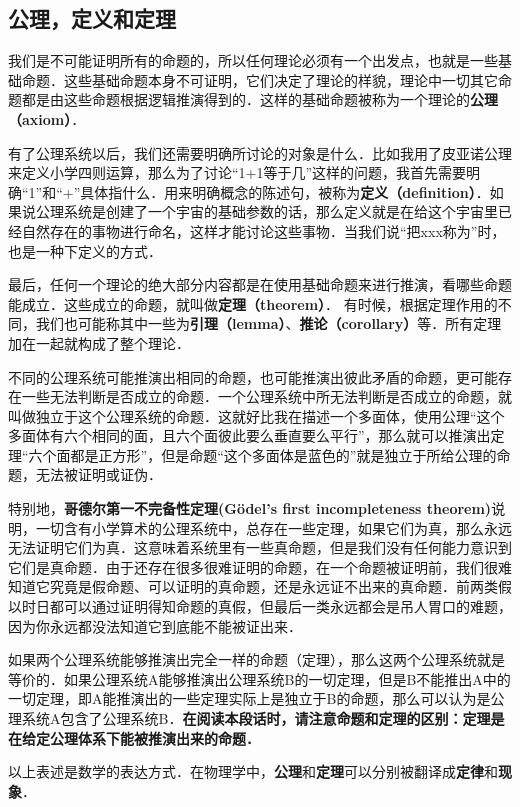 \subsection{公理，定义和定理}
我们是不可能证明所有的命题的，所以任何理论必须有一个出发点，也就是一些基础命题．这些基础命题本身不可证明，它们决定了理论的样貌，理论中一切其它命题都是由这些命题根据逻辑推演得到的．这样的基础命题被称为一个理论的\textbf{公理（axiom）}．

有了公理系统以后，我们还需要明确所讨论的对象是什么．比如我用了皮亚诺公理来定义小学四则运算，那么为了讨论“1+1等于几”这样的问题，我首先需要明确“1”和“+”具体指什么．用来明确概念的陈述句，被称为\textbf{定义（definition）}．如果说公理系统是创建了一个宇宙的基础参数的话，那么定义就是在给这个宇宙里已经自然存在的事物进行命名，这样才能讨论这些事物．当我们说“把xxx称为”时，也是一种下定义的方式．

最后，任何一个理论的绝大部分内容都是在使用基础命题来进行推演，看哪些命题能成立．这些成立的命题，就叫做\textbf{定理（theorem）}． 有时候，根据定理作用的不同，我们也可能称其中一些为\textbf{引理（lemma）}、\textbf{推论（corollary）}等．所有定理加在一起就构成了整个理论．

不同的公理系统可能推演出相同的命题，也可能推演出彼此矛盾的命题，更可能存在一些无法判断是否成立的命题．一个公理系统中所无法判断是否成立的命题，就叫做独立于这个公理系统的命题．这就好比我在描述一个多面体，使用公理“这个多面体有六个相同的面，且六个面彼此要么垂直要么平行”，那么就可以推演出定理“六个面都是正方形”，但是命题“这个多面体是蓝色的”就是独立于所给公理的命题，无法被证明或证伪．

特别地，\textbf{哥德尔第一不完备性定理(Gödel's first incompleteness theorem)}说明，一切含有小学算术的公理系统中，总存在一些定理，如果它们为真，那么永远无法证明它们为真．这意味着系统里有一些真命题，但是我们没有任何能力意识到它们是真命题．由于还存在很多很难证明的命题，在一个命题被证明前，我们很难知道它究竟是假命题、可以证明的真命题，还是永远证不出来的真命题．前两类假以时日都可以通过证明得知命题的真假，但最后一类永远都会是吊人胃口的难题，因为你永远都没法知道它到底能不能被证出来．

如果两个公理系统能够推演出完全一样的命题（定理），那么这两个公理系统就是等价的．如果公理系统A能够推演出公理系统B的一切定理，但是B不能推出A中的一切定理，即A能推演出的一些定理实际上是独立于B的命题，那么可以认为是公理系统A包含了公理系统B．\textbf{在阅读本段话时，请注意命题和定理的区别：定理是在给定公理体系下能被推演出来的命题．}


以上表述是数学的表达方式．在物理学中，\textbf{公理}和\textbf{定理}可以分别被翻译成\textbf{定律}和\textbf{现象}． 

